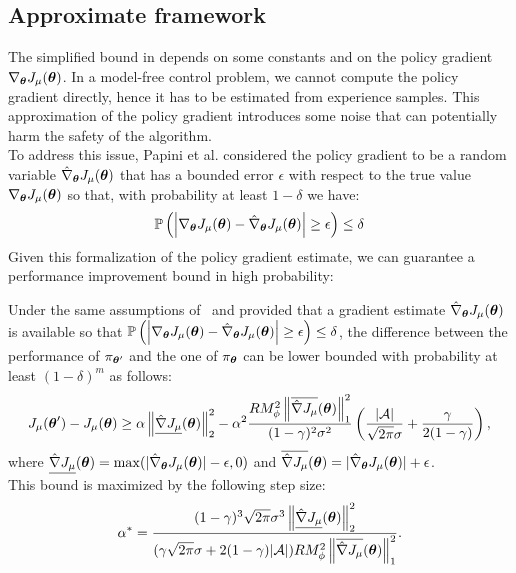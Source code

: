 \newcommand{\estgradj}{\hat{\nabla}_{\vtheta}J_\mu(\vtheta)}
\newcommand{\upgradj}{\overline{\hat{\nabla}J_\mu}(\vtheta)}
\newcommand{\botgradj}{\underline{\hat{\nabla}J_\mu}(\vtheta)}
\subsection{Approximate framework}
The simplified bound in  depends on some constants and on the policy gradient $\nabla_{{\boldsymbol{\theta}}}J_\mu({\boldsymbol{\theta}})$. In a model-free control problem, we cannot compute the policy gradient directly, hence it has to be estimated from experience samples. This approximation of the policy gradient introduces some noise that can potentially harm the safety of the algorithm.\\
To address this issue, Papini et al. considered the policy gradient to be a random variable $\estgradj$ that has a bounded error $\epsilon$ with respect to the true value $\nabla_{{\boldsymbol{\theta}}}J_\mu({\boldsymbol{\theta}})$ so that, with probability at least $1-\delta$ we have:
\[
\mathbb{P}\left(\left|\gradj - \estgradj\right|\geq\epsilon\right)\leq\delta
\]
Given this formalization of the policy gradient estimate, we can guarantee a performance improvement bound in high probability:
\begin{theorem}
Under the same assumptions of~ and provided that a gradient estimate $\estgradj$ is available so that $\mathbb{P}\left(\left|\gradj - \estgradj\right|\geq\epsilon\right)\leq\delta$, the difference between the performance of $\pi_{{\boldsymbol{\theta}}'}$ and the one of $\pi_{{\boldsymbol{\theta}}}$ can be lower bounded with probability at least $(1-\delta)^m$ as follows:
\[
J_\mu(\vtheta') - J_\mu(\vtheta) \geq \alpha\norm[2]{\botgradj}^2 - \alpha^2\frac{RM_\phi^2\norm[1]{\upgradj}^2}{(1-\gamma)^2\sigma^2}\left( \frac{|\aspace|}{\sqrt{2\pi}\sigma} + \frac{\gamma}{2(1-\gamma)} \right),
\]
where $\botgradj=\max(|\estgradj|-\epsilon, 0)$ and $\upgradj=|\estgradj|+\epsilon$.\\
This bound is maximized by the following step size:
\[
\alpha^* = \frac{(1-\gamma)^3\sqrt{2\pi}\sigma^3\norm[2]{\botgradj}^2}{(\gamma\sqrt{2\pi}\sigma +2(1-\gamma)|\aspace|)RM_\phi^2\norm[1]{\upgradj}^2}.
\]
\end{theorem}

